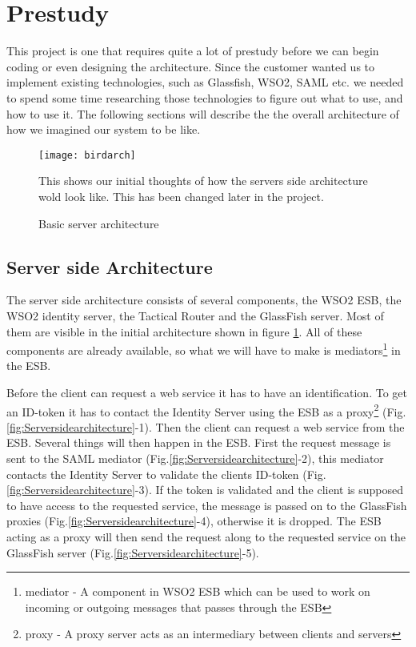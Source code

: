 \section{Prestudy}\label{Prestudy} This project is one that requires quite a lot of prestudy before we can begin coding or even designing the architecture. Since the customer wanted us to implement existing technologies, such as Glassfish, WSO2, SAML etc. we needed to spend some time researching those technologies to figure out what to use, and how to use it. The following sections will describe the the overall architecture of how we imagined our system to be like. 

        \begin{figure}[htb]
            \centering
            \texttt{[image: birdarch]}
            \caption{Basic server architecture}
            This shows our initial thoughts of how the servers side architecture wold look like. This has been changed later in the project. 
            \label{fig:birdarch}
        \end{figure}

    \subsection{Server side Architecture}\label{Server side Architecture}
    
        The server side architecture consists of several components, the WSO2 ESB, the WSO2 \gls{identity server}, the Tactical Router and the GlassFish server. Most of them are visible in the initial architecture shown in figure \ref{fig:birdarch}. All of these components are already available, so what we will have to make is \glspl{mediator}\footnote{\Gls{mediator} - A component in WSO2 ESB which can be used to work on incoming or outgoing messages that passes through the ESB} in the ESB.

        Before the client can request a web service it has to have an identification. To get an ID-\gls{token} it has to contact the Identity Server using the ESB as a \gls{proxy}\footnote{\Gls{proxy} - A proxy server acts as an intermediary between clients and servers} (Fig.\ref{fig:Serversidearchitecture}-1). Then the client can request a web service from the ESB. Several things will then happen in the ESB. First the request message is sent to the SAML mediator (Fig.\ref{fig:Serversidearchitecture}-2), this mediator contacts the Identity Server to validate the clients ID-token (Fig.\ref{fig:Serversidearchitecture}-3). If the token is validated and the client is supposed to have access to the requested service, the message is passed on to the GlassFish proxies (Fig.\ref{fig:Serversidearchitecture}-4), otherwise it is dropped. The ESB acting as a proxy will then send the request along to the requested service on the GlassFish server (Fig.\ref{fig:Serversidearchitecture}-5).

